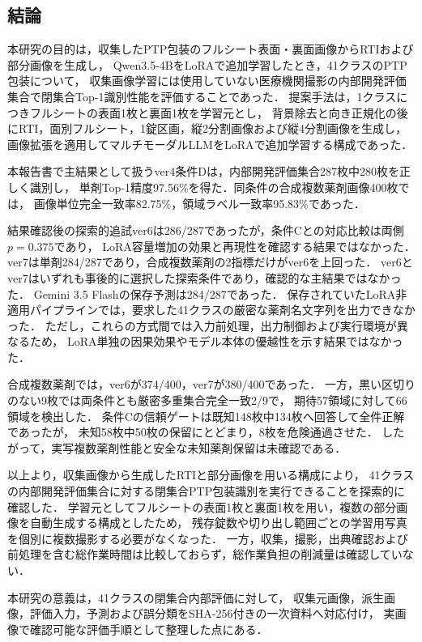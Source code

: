 \documentclass[uplatex,dvipdfmx]{jsarticle}
\begin{document}
\subsection{結論}

本研究の目的は，収集したPTP包装のフルシート表面・裏面画像からRTIおよび部分画像を生成し，
Qwen3.5-4BをLoRAで追加学習したとき，41クラスのPTP包装について，
収集画像学習には使用していない医療機関撮影の内部開発評価集合で閉集合Top-1識別性能を評価することであった．
提案手法は，1クラスにつきフルシートの表面1枚と裏面1枚を学習元とし，
背景除去と向き正規化の後にRTI，面別フルシート，1錠区画，縦2分割画像および縦4分割画像を生成し，
画像拡張を適用してマルチモーダルLLMをLoRAで追加学習する構成であった．

本報告書で主結果として扱うver4条件Dは，内部開発評価集合287枚中280枚を正しく識別し，
単剤Top-1精度97.56\%を得た．同条件の合成複数薬剤画像400枚では，
画像単位完全一致率82.75\%，領域ラベル一致率95.83\%であった．

結果確認後の探索的追試ver6は286/287であったが，条件Cとの対応比較は両側$p=0.375$であり，
LoRA容量増加の効果と再現性を確認する結果ではなかった．
ver7は単剤284/287であり，合成複数薬剤の2指標だけがver6を上回った．
ver6とver7はいずれも事後的に選択した探索条件であり，確認的な主結果ではなかった．
Gemini 3.5 Flashの保存予測は284/287であった．
保存されていたLoRA非適用パイプラインでは，要求した41クラスの厳密な薬剤名文字列を出力できなかった．
ただし，これらの方式間では入力前処理，出力制御および実行環境が異なるため，
LoRA単独の因果効果やモデル本体の優越性を示す結果ではなかった．

合成複数薬剤では，ver6が374/400，ver7が380/400であった．
一方，黒い区切りのない9枚では両条件とも厳密多重集合完全一致2/9で，
期待57領域に対して66領域を検出した．
条件Cの信頼ゲートは既知148枚中134枚へ回答して全件正解であったが，
未知58枚中50枚の保留にとどまり，8枚を危険通過させた．
したがって，実写複数薬剤性能と安全な未知薬剤保留は未確認である．

以上より，収集画像から生成したRTIと部分画像を用いる構成により，
41クラスの内部開発評価集合に対する閉集合PTP包装識別を実行できることを探索的に確認した．
学習元としてフルシートの表面1枚と裏面1枚を用い，複数の部分画像を自動生成する構成としたため，
残存錠数や切り出し範囲ごとの学習用写真を個別に複数撮影する必要がなくなった．
一方，収集，撮影，出典確認および前処理を含む総作業時間は比較しておらず，総作業負担の削減量は確認していない．

本研究の意義は，41クラスの閉集合内部評価に対して，
収集元画像，派生画像，評価入力，予測および誤分類をSHA-256付きの一次資料へ対応付け，
実画像で確認可能な評価手順として整理した点にある．
\end{document}
